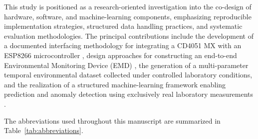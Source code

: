 ﻿\documentclass[journal]{IEEEtran}
\begin{document}
This study is positioned as a research-oriented investigation into the
co-design of hardware, software, and machine-learning components,
emphasizing reproducible implementation strategies, structured data
handling practices, and systematic evaluation methodologies. The principal
contributions include the development of a documented interfacing
methodology for integrating a CD4051 MX with an ESP8266 microcontroller
\cite{ref10}, design approaches for constructing an end-to-end
Environmental Monitoring Device (EMD) \cite{ref11}, the generation of a
multi-parameter temporal environmental dataset collected under controlled
laboratory conditions, and the realization of a structured machine-learning
framework enabling prediction and anomaly detection using exclusively real
laboratory measurements \cite{ref12}.

The abbreviations used throughout this manuscript are summarized in
Table~\ref{tab:abbreviations}.
\end{document}
